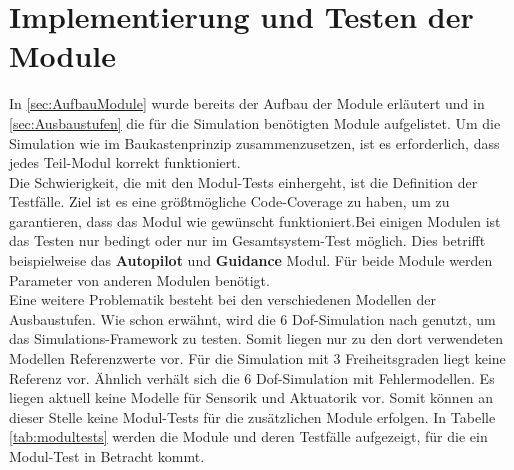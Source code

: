 \section{Implementierung und Testen der Module}
In \ref{sec:AufbauModule} wurde bereits der Aufbau der Module erläutert und in \ref{sec:Ausbaustufen} die für die Simulation benötigten Module aufgelistet. Um die Simulation wie im Baukastenprinzip zusammenzusetzen, ist es erforderlich, dass jedes Teil-Modul korrekt funktioniert.\\
Die Schwierigkeit, die mit den Modul-Tests einhergeht, ist die Definition der Testfälle. Ziel ist es eine größtmögliche Code-Coverage zu haben, um zu garantieren, dass das Modul wie gewünscht funktioniert.Bei einigen Modulen ist das Testen nur bedingt oder  nur im Gesamtsystem-Test möglich. Dies betrifft beispielweise das \textbf{Autopilot} und \textbf{Guidance} Modul. Für beide Module werden Parameter von anderen Modulen benötigt. \\Eine weitere Problematik besteht bei den verschiedenen  Modellen der Ausbaustufen. Wie schon erwähnt, wird die 6 Dof-Simulation nach \cite{Olucak.15.02.2017} genutzt, um das Simulations-Framework zu testen. Somit liegen nur zu den dort verwendeten Modellen Referenzwerte vor. Für die Simulation mit 3 Freiheitsgraden liegt keine Referenz vor. Ähnlich verhält sich die 6 Dof-Simulation mit Fehlermodellen. Es liegen aktuell keine Modelle für Sensorik und Aktuatorik vor. Somit können an dieser Stelle keine Modul-Tests für die zusätzlichen Module erfolgen.
In Tabelle \ref{tab:modultests} werden die Module  und deren Testfälle aufgezeigt, für die ein Modul-Test in Betracht kommt.\\
